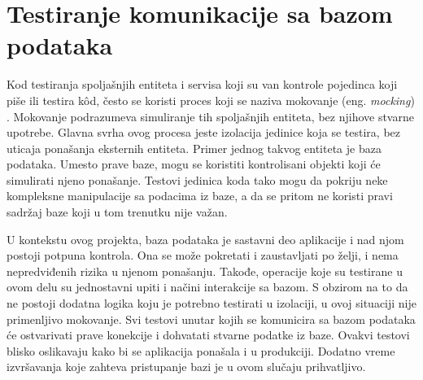 \documentclass[12pt,oneside]{memoir}
\begin{document}
\section{Testiranje komunikacije sa bazom podataka}
\label{sec:baza}

\par Kod testiranja spoljašnjih entiteta i servisa koji su van kontrole pojedinca koji piše ili testira k\^{o}d, često se koristi proces koji se naziva mokovanje (eng. \emph{mocking}) \cite{external}. Mokovanje podrazumeva simuliranje tih spoljašnjih entiteta, bez njihove stvarne upotrebe. Glavna svrha ovog procesa jeste izolacija jedinice koja se testira, bez uticaja ponašanja eksternih entiteta. Primer jednog takvog entiteta je baza podataka. Umesto prave baze, mogu se koristiti kontrolisani objekti koji će simulirati njeno ponašanje. Testovi jedinica koda tako mogu da pokriju neke kompleksne manipulacije sa podacima iz baze, a da se pritom ne koristi pravi sadržaj baze koji u tom trenutku nije važan. 
\par U kontekstu ovog projekta, baza podataka je sastavni deo aplikacije i nad njom postoji potpuna kontrola. Ona se može pokretati i zaustavljati po želji, i nema nepredviđenih rizika u njenom ponašanju. Takođe, operacije koje su testirane u ovom delu su jednostavni upiti i načini interakcije sa bazom. S obzirom na to da ne postoji dodatna logika koju je potrebno testirati u izolaciji, u ovoj situaciji nije primenljivo mokovanje. Svi testovi unutar kojih se komunicira sa bazom podataka će ostvarivati prave konekcije i dohvatati stvarne podatke iz baze. Ovakvi testovi blisko oslikavaju kako bi se aplikacija ponašala i u produkciji. Dodatno vreme izvršavanja koje zahteva pristupanje bazi je u ovom slučaju prihvatljivo.
\end{document}
